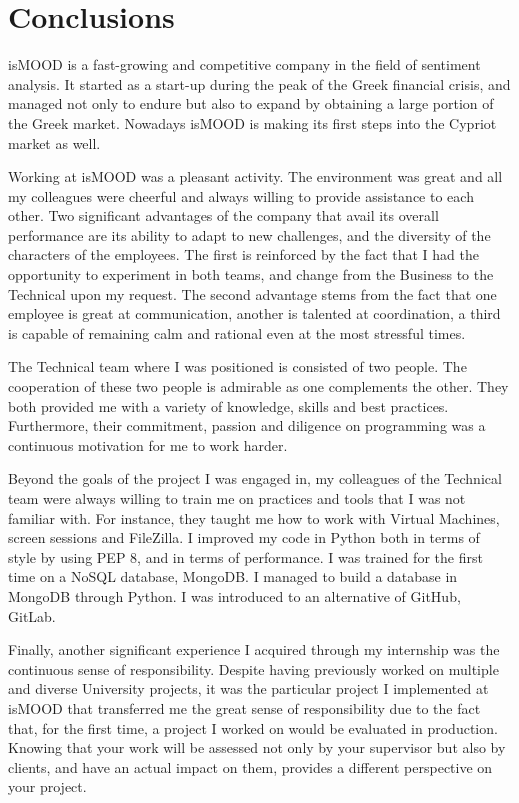\section{Conclusions}
\label{sec:conclusions}

isMOOD is a fast-growing and competitive company in the field of sentiment analysis.
It started as a start-up during the peak of the Greek financial crisis,
and managed not only to endure but also to expand
by obtaining a large portion of the Greek market.
Nowadays isMOOD is making its first steps into the Cypriot market as well.

Working at isMOOD was a pleasant activity.
The environment was great and all my colleagues were cheerful
and always willing to provide assistance to each other.
Two significant advantages of the company 
that avail its overall performance are its ability to adapt to new challenges,
and the diversity of the characters of the employees.
The first is reinforced by the fact
that I had the opportunity to experiment in both teams,
and change from the Business to the Technical upon my request.
The second advantage stems from the fact
that one employee is great at communication,
another is talented at coordination,
a third is capable of remaining calm and rational
even at the most stressful times.

The Technical team where I was positioned is consisted of two people.
The cooperation of these two people is admirable as one complements the other.
They both provided me with a variety of knowledge, skills and best practices.
Furthermore, their commitment, passion and diligence on programming
was a continuous motivation for me to work harder.

Beyond the goals of the project I was engaged in,
my colleagues of the Technical team were always willing
to train me on practices and tools that I was not familiar with.
For instance, they taught me how to work with Virtual Machines,
screen sessions and FileZilla.
I improved my code in Python both in terms of style by using PEP 8,
and in terms of performance.
I was trained for the first time on a NoSQL database, MongoDB.
I managed to build a database in MongoDB through Python.
I was introduced to an alternative of GitHub, GitLab.

Finally, another significant experience I acquired through my internship
was the continuous sense of responsibility.
Despite having previously worked on multiple and diverse University projects,
it was the particular project I implemented at isMOOD
that transferred me the great sense of responsibility
due to the fact that, for the first time,
a project I worked on would be evaluated in production.
Knowing that your work will be assessed not only by your supervisor
but also by clients, and have an actual impact on them,
provides a different perspective on your project.
